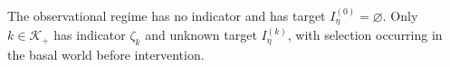 The observational regime has no indicator and has target \(I_\eta^{(0)}=\varnothing\).  Only \(k\in\mathcal K_+\) has indicator \(\zeta_k\) and unknown target \(I_\eta^{(k)}\), with selection occurring in the basal world before intervention.